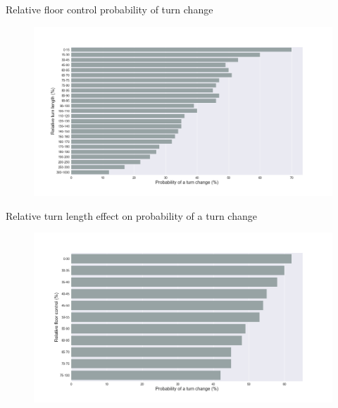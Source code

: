 \begin{frame}{Relative floor control probability of turn change}
\begin{figure}[ht!]
\centering
\includegraphics[width=36em]{../scikitlearn/figures/f5.png}\vspace{-1em}
\end{figure}
\end{frame}

\begin{frame}{Relative turn length effect on probability of a turn change}
\begin{figure}[ht!]
\centering
\includegraphics[width=36em]{../scikitlearn/figures/f6.png}\vspace{-1em}
\end{figure}
\end{frame}

